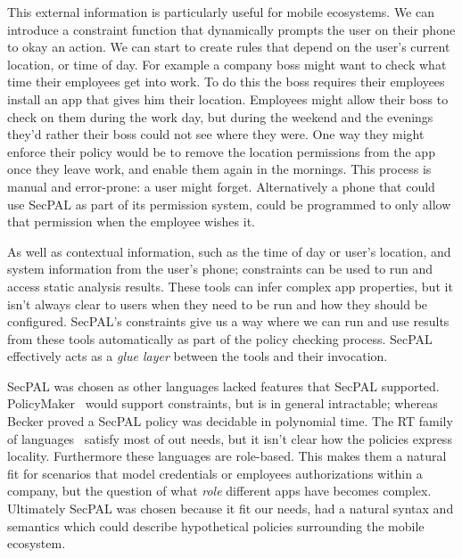 \documentclass[thesis.tex]{subfiles}
\begin{document}
\begin{description}
    This external information is particularly useful for mobile ecosystems. We
    can introduce a constraint function that dynamically prompts the user on their
    phone to okay an action. We can start to create rules that depend on the user's
    current location, or time of day. For example a company boss might want to check
    what time their employees get into work. To do this the boss requires their
    employees install an app that gives him their location. Employees might allow
    their boss to check on them during the work day, but during the weekend and the
    evenings they'd rather their boss could not see where they were. One way they
    might enforce their policy would be to remove the location permissions from the
    app once they leave work, and enable them again in the mornings. This process is
    manual and error-prone: a user might forget. Alternatively a phone that could
    use SecPAL as part of its permission system, could be programmed to only allow
    that permission when the employee wishes it.

    As well as contextual information, such as the time of day or user's
    location, and system information from the user's phone; constraints can be used to run and access
    static analysis results.  These tools can infer complex app properties, but
    it isn't always clear to users when they need to be run and how they should
    be configured.  SecPAL's constraints give us a way where we can run and use
    results from these tools automatically as part of the policy checking
    process. SecPAL effectively acts as a \emph{glue layer} between the tools
    and their invocation.

\end{description}
%
SecPAL was chosen as other languages lacked features that SecPAL supported.
PolicyMaker~\cite{blaze_decentralized_1996} would support constraints, but is in
general intractable; whereas Becker proved a SecPAL policy was decidable in
polynomial time.  The RT family of
languages~\cite{li_datalog_2003,ninghui_li_design_2002,li_distributed_2003}
satisfy most of out needs, but it isn't clear how the policies express locality.
Furthermore these languages are role-based.  This makes them a natural fit for
scenarios that model credentials or employees authorizations within a company,
but the question of what \emph{role} different apps have becomes complex.
Ultimately SecPAL was chosen because it fit our needs, had a natural syntax and
semantics which could describe hypothetical policies surrounding the mobile
ecosystem.
\end{document}
